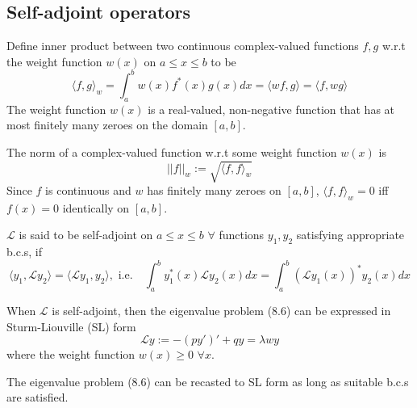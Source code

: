 \documentclass[a4paper]{article}
\begin{document}
\subsection{Self-adjoint operators}
\begin{defi}
Define inner product between two continuous complex-valued functions $f,g$ w.r.t the weight function $w(x)$ on $a\leq x\leq b$ to be
\begin{equation}
\langle f,g\rangle_w=\int_a^bw(x)f^*(x)g(x)dx=\langle wf,g\rangle=\langle f,wg\rangle\tag{8.7}
\end{equation}
The weight function $w(x)$ is a real-valued, non-negative function that has at most finitely many zeroes on the domain $[a,b]$.
\end{defi}
\begin{defi}[Norm]
The norm of a complex-valued function w.r.t some weight function $w(x)$ is
$$||f||_w:=\sqrt{\langle f,f\rangle_w}$$
Since $f$ is continuous and $w$ has finitely many zeroes on $[a,b]$, $\langle f,f\rangle_w=0$ iff $f(x)=0$ identically on $[a,b]$.
\end{defi}
\begin{defi}
$\mathcal{L}$ is said to be self-adjoint on $a\leq x\leq b$ $\forall$ functions $y_1,y_2$ satisfying appropriate b.c.s, if
\begin{equation}
    \langle y_1,\mathcal{L}y_2\rangle=\langle\mathcal{L}y_1,y_2\rangle,\text{ i.e.}\quad \int_a^by_1^*(x)\mathcal{L}y_2(x)dx=\int_a^b(\mathcal{L}y_1(x))^*y_2(x)dx\tag{8.8}
\end{equation}
\end{defi}
\begin{defi}
When $\mathcal{L}$ is self-adjoint, then the eigenvalue problem (8.6) can be expressed in Sturm-Liouville (SL) form
\begin{equation}
    \mathcal{L}y:=-(p y')'+qy=\lambda wy\tag{8.9}
\end{equation}
where the weight function $w(x)\geq 0$ $\forall x$.
\end{defi}
\begin{prop}
The eigenvalue problem (8.6) can be recasted to SL form as long as suitable b.c.s are satisfied.
\end{prop}
\end{document}

